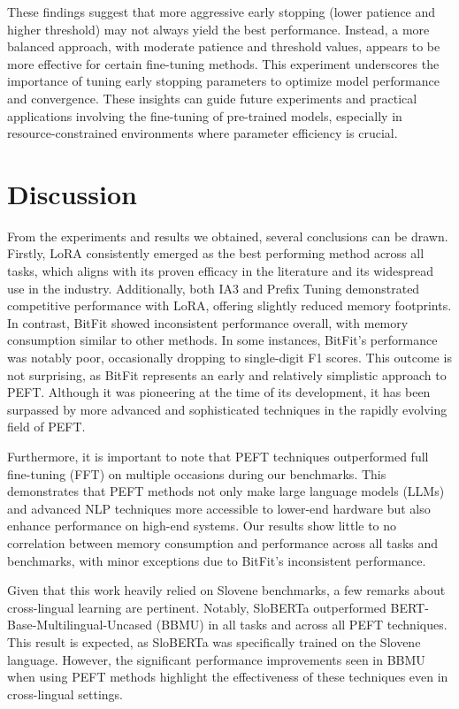 \documentclass[fleqn,moreauthors,10pt]{ds_report}
\begin{document}
These findings suggest that more aggressive early stopping (lower patience and higher threshold) may not always yield the best performance. Instead, a more balanced approach, with moderate patience and threshold values, appears to be more effective for certain fine-tuning methods. This experiment underscores the importance of tuning early stopping parameters to optimize model performance and convergence. These insights can guide future experiments and practical applications involving the fine-tuning of pre-trained models, especially in resource-constrained environments where parameter efficiency is crucial.

\section*{Discussion}

From the experiments and results we obtained, several conclusions can be drawn. Firstly, LoRA consistently emerged as the best performing method across all tasks, which aligns with its proven efficacy in the literature and its widespread use in the industry. Additionally, both IA3 and Prefix Tuning demonstrated competitive performance with LoRA, offering slightly reduced memory footprints. In contrast, BitFit showed inconsistent performance overall, with memory consumption similar to other methods. In some instances, BitFit's performance was notably poor, occasionally dropping to single-digit F1 scores. This outcome is not surprising, as BitFit represents an early and relatively simplistic approach to PEFT. Although it was pioneering at the time of its development, it has been surpassed by more advanced and sophisticated techniques in the rapidly evolving field of PEFT.

Furthermore, it is important to note that PEFT techniques outperformed full fine-tuning (FFT) on multiple occasions during our benchmarks. This demonstrates that PEFT methods not only make large language models (LLMs) and advanced NLP techniques more accessible to lower-end hardware but also enhance performance on high-end systems. Our results show little to no correlation between memory consumption and performance across all tasks and benchmarks, with minor exceptions due to BitFit's inconsistent performance. 

Given that this work heavily relied on Slovene benchmarks, a few remarks about cross-lingual learning are pertinent. Notably, SloBERTa outperformed BERT-Base-Multilingual-Uncased (BBMU) in all tasks and across all PEFT techniques. This result is expected, as SloBERTa was specifically trained on the Slovene language.  However, the significant performance improvements seen in BBMU when using PEFT methods highlight the effectiveness of these techniques even in cross-lingual settings. 
\end{document}
